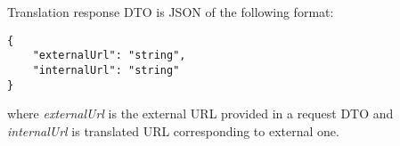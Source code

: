 \documentclass[../main.tex]{subfiles}
\begin{document}
Translation response DTO is JSON of the following format:
\begin{lstlisting}[numbers=none]
{
    "externalUrl": "string",
    "internalUrl": "string"
}
\end{lstlisting}

where \textit{externalUrl} is the external URL provided in a request DTO and \textit{internalUrl} is translated URL corresponding to external one.
\end{document}
